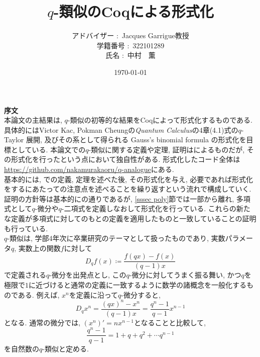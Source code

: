 \documentclass[11pt]{jarticle}
\theoremstyle{mystyle}
\newcommand{\Z}{\mathbb{Z}}
\newcommand{\R}{\mathbb{R}}
\newcommand{\qcoe}[2]{\left[\begin{array}{ccc}#1\\#2\end{array}\right]}
\newcommand{\0}{\textbf{0}}
\newcommand{\1}{\textbf{1}}
\newcommand{\2}{\textbf{2}}
\begin{document}
\title{$q$-類似のCoqによる形式化}
\author{アドバイザー $\colon$ Jacques Garrigue教授\\
           学籍番号 $\colon$ 322101289\\
           氏名 $\colon$ 中村　薫}
\date{\today}
\maketitle
\textbf{序文}\\
本論文の主結果は, $q$-類似の初等的な結果をCoqによって形式化するものである. 具体的にはVictor Kac, Pokman Cheungの{\it Quantum Calculus}\cite{Kac}の4章(4.1)式の$q$-Taylor 展開, 及びその系として得られる Gauss's binomial formula の形式化を目標としている. 
本論文での$q$-類似に関する定義や定理, 証明は\cite{Kac}によるものだが, その形式化を行ったという点において独自性がある. 形式化したコード全体は\url{https://github.com/nakamurakaoru/q-analogue}\cite{coq qana}にある. \\
基本的には, \cite{Kac}での定義, 定理を述べた後, その形式化を与え, 必要であれば形式化をするにあたっての注意点を述べることを繰り返すという流れで構成していく. 
証明の方針等は基本的に\cite{Kac}の通りであるが, \ref{sssec poly}節では一部\cite{Kac}から離れ, 多項式として$q$-微分や$q$-二項式を定義しなおして形式化を行っている. これらの新たな定義が多項式に対してのもとの定義を適用したものと一致していることの証明も行っている. \\
$q$-類似は, 学部4年次に卒業研究のテーマとして扱ったものであり, 実数パラメータ$q$, 実数上の関数$f$に対して
\[
  D_q f(x) \coloneqq \frac{f(qx) - f(x)}{(q - 1) x}
\]
で定義される$q$-微分を出発点とし, この$q$-微分に対してうまく振る舞い, かつ$q$を極限で$1$に近づけると通常の定義に一致するように数学の諸概念を一般化するものである.
例えば, $x^n$を定義に沿って$q$-微分すると, 
\[
  D_q x^n = \frac{(qx)^n - x^n}{(q - 1) x} = \frac{q^n - 1}{q - 1} x^{n - 1}
\]
となる. 通常の微分では, $(x^n)' = n x^{n - 1}$となることと比較して, 
\[
  \frac{q^n - 1}{q - 1} = 1 + q + q^2 + \cdots q^{n - 1}
\]
を自然数の$q$-類似と定める. 
\end{document}

